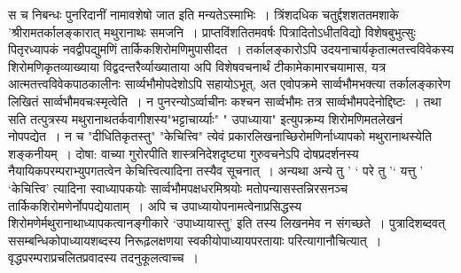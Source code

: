 \documentclass[10pt, openany]{book}
\begin{document}
स च निबन्धः पुनरिदानीं नामावशेषो जात इति मन्यतेऽस्माभिः~। त्रिंशदधिक चतुर्द्दशशततमशाके 'श्रीरामतर्कालङ्कारात् मथुरानाथः समजनि~। प्राप्तविंशतितमवर्षः पित्रादितोऽधीतविद्यो विशेषबुभुत्सुः पितृरध्यापकं नवद्वीपद्युमणिं तार्किकशिरोमणिमुपासीदत~। तर्कालङ्कारोऽपि उदयनाचार्यकृतात्मतत्त्वविवेकस्य शिरोमणिकृतव्याख्याया विद्वदन्तरैर्व्याख्याताया अपि विशेषवचनार्थं टीकामेकामारचयामास, यत्र आत्मतत्त्वविवेकपाठकालीनः सार्व्यभौमोपदेशोऽपि सहायोऽभूत्, अत एवोपक्रमे सार्व्वभौमभक्त्या तर्कालङ्कारेण लिखितं सार्व्वभौमवचःस्मृत्वेति~। न पुनरन्योऽर्व्वाचीनः कश्चन सार्व्वभौमः तत्र सार्व्वभौमपदेनोद्दिष्टः~। तथा सति तत्पुत्रस्य मथुरानाथतर्कवागीशस्य{\qt "भट्टाचार्य्याः" " उपाध्याया"} इत्युपक्रम्य शिरोमणिमतलेखनं नोपपद्येत~। न च {\qt "दीधितिकृतस्तु"} "केचित्त्वि" त्येवं प्रकारलिखनाच्छिरोमणिर्नाध्यापको मथुरानाथस्येति शङ्कनीयम्~। दोषा: वाच्या गुरोरपीति शास्त्रनिदेशदृष्ट्या गुरुवचनेऽपि दोषप्रदर्शनस्य नैयायिकपरम्पराभ्युपगतत्वेन केचित्त्वित्यादिना तस्यैव सूचनात्~। अन्यथा {\qt अन्ये तु ' ` परे तु '` यत्तु ' `केचित्त्वि'} त्यादिना स्वाध्यापकयोः सार्व्वभौमपक्षधरमिश्रयोः मतोपन्यासस्तन्निरसनञ्च तार्किकशिरोमणेर्नोपपद्येयाताम्~। अपि च उपाध्यायोपनामत्वेनाप्रसिद्धस्य शिरोमणेर्मथुरानाथाध्यापकत्वानङ्गीकारे {\qt `उपाध्यायास्तु'} इति  तस्य लिखनमेव न संगच्छते~। पुत्रादिशब्दवत् ससम्बन्धिकोपाध्यायशब्दस्य निरूढ़लक्षणया स्वकीयोपाध्यायपरतायाः परित्यागानौचित्यात्~। वृद्धपरम्पराप्रचलितप्रवादस्य तदनुकूलत्वाच्च~।\\
\end{document}
